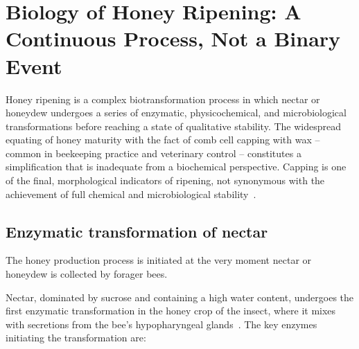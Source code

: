 
\section{Biology of Honey Ripening: A Continuous Process, Not a Binary Event}

Honey ripening is a complex biotransformation process in which
nectar or honeydew undergoes a series of enzymatic, physicochemical,
and microbiological transformations before reaching a state of
qualitative stability. The widespread equating of honey maturity
with the fact of comb cell capping with wax -- common in beekeeping
practice and veterinary control -- constitutes a simplification that
is inadequate from a biochemical perspective. Capping is one of the
final, morphological indicators of ripening, not synonymous with the
achievement of full chemical and microbiological
stability~\cite{zhang2021,sun2021}.

\subsection{Enzymatic transformation of nectar}
The honey production process is initiated at the very moment nectar
or honeydew is collected by forager bees. 

Nectar, dominated by sucrose and containing a high water content, undergoes the first enzymatic transformation in the honey crop of the insect, where it mixes with secretions from the bee’s hypopharyngeal glands~\cite{biochemreactions2022}. The key enzymes initiating
the transformation are:

